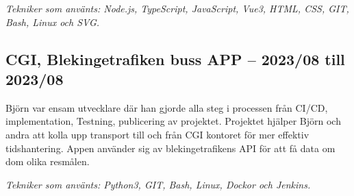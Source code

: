 \documentclass{article}
\begin{document}
\begin{minipage}[t]{0.7\textwidth}
\vspace{5pt}\textit{Tekniker som använts: Node.js, TypeScript, JavaScript, Vue3, HTML, CSS, GIT, Bash, Linux och SVG.}

\vspace{15pt} %
\subsection*{\textcolor{colorTitelErfarenhet}{CGI, Blekingetrafiken buss APP – 2023/08 till 2023/08}}
Björn var ensam utvecklare där han gjorde alla steg i processen från CI/CD, implementation, 
Testning, publicering av projektet. Projektet hjälper Björn och andra att kolla upp transport 
till och från CGI kontoret för mer effektiv tidshantering. Appen använder sig av blekingetrafikens 
API för att få data om dom olika resmålen.

\vspace{5pt}\textit{Tekniker som använts: Python3, GIT, Bash, Linux, Dockor och Jenkins.}

\end{minipage}%
\hfill
\end{document}
